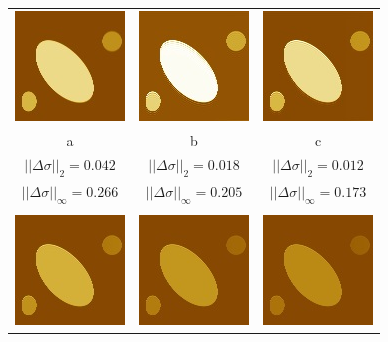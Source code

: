 \documentclass{procDDs}
\begin{document}
\begin{figure}[h!]\center
	\footnotesize
	\begin{tabular}{ccc}
		\includegraphics[width=0.2\linewidth]{img/5/1.jpg}
		&
		\includegraphics[width=0.2\linewidth]{img/5/3.jpg}
		&
		\includegraphics[width=0.2\linewidth]{img/5/4.jpg}
		\\
		a & b & c 
		\\
		$||\Delta\sigma||_2 = 0.042$ & 
		$||\Delta\sigma||_2 = 0.018$ &  
		$||\Delta\sigma||_2 = 0.012$  
		\\
		$||\Delta\sigma||_\infty = 0.266$ & 
		$||\Delta\sigma||_\infty = 0.205$ &  
		$||\Delta\sigma||_\infty = 0.173$
		\\ \\
		\includegraphics[width=0.2\linewidth]{img/5/6.jpg}
		&
		\includegraphics[width=0.2\linewidth]{img/5/7.jpg}
		&
		\includegraphics[width=0.2\linewidth]{img/5/8.jpg}

\end{tabular}
\end{figure}
\end{document}
